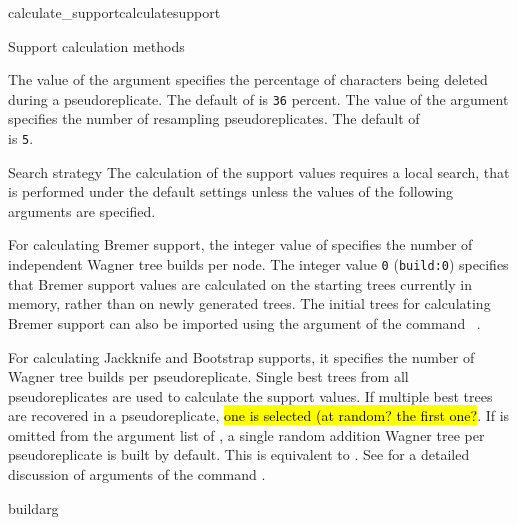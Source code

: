 \begin{command}{calculate\_support}{calculatesupport}
\begin{arguments}
\begin{argumentgroup}{Support calculation methods}
	        
                \begin{description}
                        {The value of the argument  specifies the
                        percentage of characters being deleted during a pseudoreplicate. The
                        default of  is \texttt{36} percent.}
                        {}
                        {The value of the argument  specifies the
                        number of resampling pseudoreplicates. The default of \\
                         is \texttt{5}.}
                        {}
               \end{description}  
		\end{argumentgroup}

        \begin{argumentgroup}{Search strategy}
            {The calculation of the support values requires a local search,
            that is performed under the default settings unless the values
            of the following arguments are specified.}
		 
             {For calculating Bremer support, the integer value of
              specifies the number of independent
             Wagner tree builds per node. The integer value \texttt{0}
             (\texttt{build:0}) specifies that Bremer support values are
             calculated on the starting trees currently
             in memory, rather than on newly generated trees.
             The initial trees for calculating Bremer support
             can also be imported using the argument 
             of the command ~.
             
             For calculating Jackknife
             and Bootstrap supports, it specifies the number of
             Wagner tree builds per pseudoreplicate.  Single best trees from all
             pseudoreplicates are used to calculate the support values. If
             multiple best trees are recovered in a pseudoreplicate, \hl{one 
             is selected (at random? the first one?}. If  is
             omitted from the argument list of ,
             a single random addition Wagner tree per
             pseudoreplicate is built by default. This is equivalent to 
             . See
              for a detailed discussion of
             arguments of the command .}
             {buildarg}


\end{argumentgroup}
\end{arguments}
\end{command}

